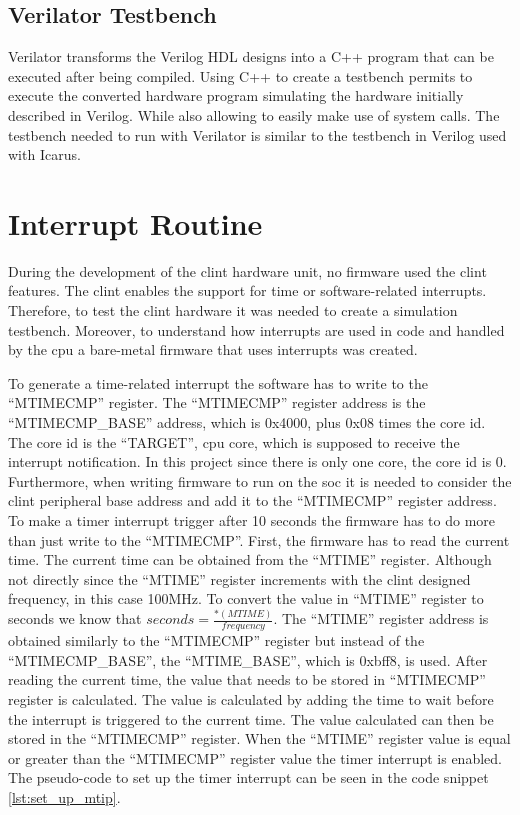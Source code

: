 \subsection{Verilator Testbench}
Verilator transforms the Verilog HDL designs into a C++ program that can be executed after being compiled. Using C++ to create a testbench permits to execute the converted hardware program simulating the hardware initially described in Verilog. While also allowing to easily make use of system calls. The testbench needed to run with Verilator is similar to the testbench in Verilog used with Icarus.

\section{Interrupt Routine}
\label{section:barebones_interrupt_routine}
During the development of the \acrshort{clint} hardware unit, no firmware used the \acrshort{clint} features. The \acrshort{clint} enables the support for time or software-related interrupts. Therefore, to test the \acrshort{clint} hardware it was needed to create a simulation testbench. Moreover, to understand how interrupts are used in code and handled by the \acrshort{cpu} a bare-metal firmware that uses interrupts was created.

To generate a time-related interrupt the software has to write to the \enquote{MTIMECMP} register. The \enquote{MTIMECMP} register address is the \enquote{MTIMECMP\_BASE} address, which is 0x4000, plus 0x08 times the core id. The core id is the \enquote{TARGET}, \acrshort{cpu} core, which is supposed to receive the interrupt notification. In this project since there is only one core, the core id is 0. Furthermore, when writing firmware to run on the \acrshort{soc} it is needed to consider the \acrshort{clint} peripheral base address and add it to the \enquote{MTIMECMP} register address. To make a timer interrupt trigger after 10 seconds the firmware has to do more than just write to the \enquote{MTIMECMP}. First, the firmware has to read the current time. The current time can be obtained from the \enquote{MTIME} register. Although not directly since the \enquote{MTIME} register increments with the \acrshort{clint} designed frequency, in this case 100MHz. To convert the value in \enquote{MTIME} register to seconds we know that $seconds=\frac{*(MTIME)}{frequency}$. The \enquote{MTIME} register address is obtained similarly to the \enquote{MTIMECMP} register but instead of the \enquote{MTIMECMP\_BASE}, the \enquote{MTIME\_BASE}, which is 0xbff8, is used. After reading the current time, the value that needs to be stored in \enquote{MTIMECMP} register is calculated. The value is calculated by adding the time to wait before the interrupt is triggered to the current time. The value calculated can then be stored in the \enquote{MTIMECMP} register. When the \enquote{MTIME} register value is equal or greater than the \enquote{MTIMECMP} register value the timer interrupt is enabled. The pseudo-code to set up the timer interrupt can be seen in the code snippet \ref*{lst:set_up_mtip}.

